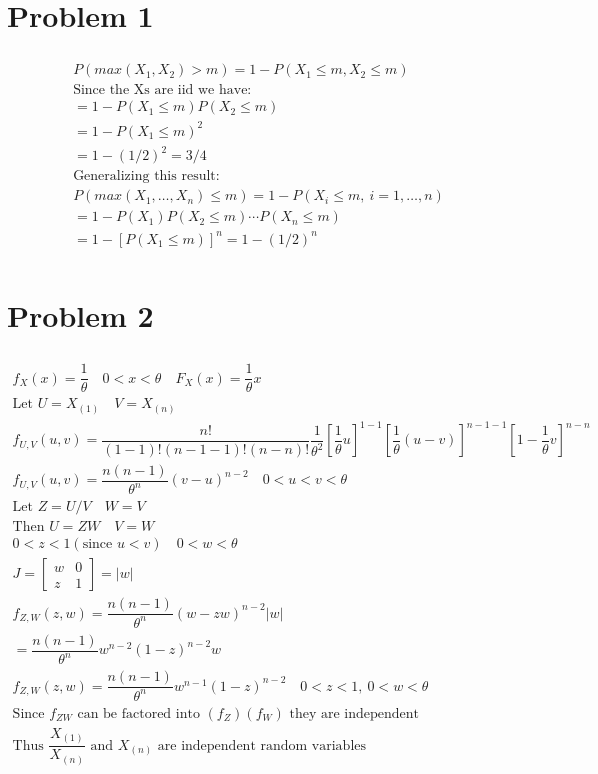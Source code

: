 \documentclass{article}
\begin{document}
\begin{flushleft}

	\section*{Problem 1}
	
\begin{multline*}\\
P(max(X_1,X_2)>m)=1-P(X_1\leq m,X_2\leq m)\\
\text{Since the Xs are iid we have:}\\
=1-P(X_1\leq m)P(X_2\leq m)\\
=1-P(X_1\leq m)^2\\
=1-(1/2)^2=3/4\\
\text{Generalizing this result:}\\
P(max(X_1,\dots,X_n)\leq m)=1-P(X_i\leq m, \  i=1,\dots,n)\\
=1-P(X_1)P(X_2\leq m)\cdots P(X_n\leq m)\\
=1-[P(X_1\leq m)]^n=1-(1/2)^n\\
\end{multline*}


	\section*{Problem 2}
	
\begin{multline*}\\
f_X(x)=\dfrac{1}{\theta} \quad 0<x<\theta \quad F_X(x)=\dfrac{1}{\theta}x\\
\text{Let } U=X_{(1)} \quad V=X_{(n)}\\
f_{U,V}(u,v)=\dfrac{n!}{(1-1)!(n-1-1)!(n-n)!}\dfrac{1}{\theta^2}[\dfrac{1}{\theta}u]^{1-1}[\dfrac{1}{\theta}(u-v)]^{n-1-1}[1-\dfrac{1}{\theta}v]^{n-n}\\
f_{U,V}(u,v)=\dfrac{n(n-1)}{\theta^n}(v-u)^{n-2} \quad 0<u<v<\theta\\
\text{Let } Z=U/V \quad W=V\\
\text{Then } U=ZW \quad V=W\\
0<z<1 (\text{since } u<v) \quad 0<w<\theta\\
J=\begin{bmatrix}
w&0\\
z& 1
\end{bmatrix}=|w|\\
f_{Z,W}(z,w)=\dfrac{n(n-1)}{\theta^n}(w-zw)^{n-2}|w|\\
=\dfrac{n(n-1)}{\theta^n}w^{n-2}(1-z)^{n-2}w\\
f_{Z,W}(z,w)=\dfrac{n(n-1)}{\theta^n}w^{n-1}(1-z)^{n-2} \quad 0<z<1, \ 0<w<\theta\\
\text{Since } f_{ZW} \text{ can be factored into } (f_Z)(f_W) \text{ they are independent}\\
\text{Thus } \dfrac{X_{(1)}}{X_{(n)}} \text{ and } X_{(n)} \text{ are independent random variables}\\
\end{multline*}



\end{flushleft}
\end{document}
